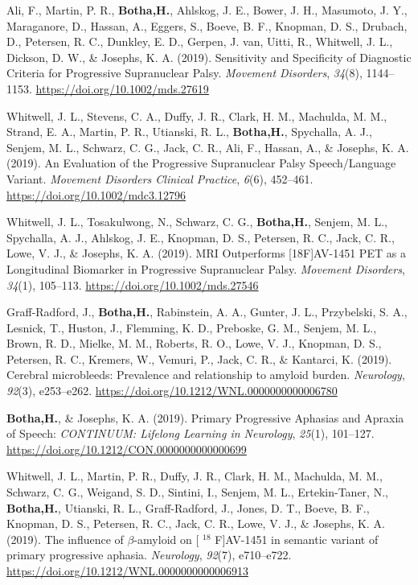 \documentclass[11pt, a4paper]{awesome-cv}
\begin{document}
\leavevmode\hypertarget{ref-ali_sensitivity_2019}{}%
Ali, F., Martin, P. R., \textbf{Botha,H.}, Ahlskog, J. E., Bower, J. H.,
Masumoto, J. Y., Maraganore, D., Hassan, A., Eggers, S., Boeve, B. F.,
Knopman, D. S., Drubach, D., Petersen, R. C., Dunkley, E. D., Gerpen, J.
van, Uitti, R., Whitwell, J. L., Dickson, D. W., \& Josephs, K. A.
(2019). Sensitivity and {Specificity} of {Diagnostic} {Criteria} for
{Progressive} {Supranuclear} {Palsy}. \emph{Movement Disorders},
\emph{34}(8), 1144--1153. \url{https://doi.org/10.1002/mds.27619}

\leavevmode\hypertarget{ref-whitwell_evaluation_2019}{}%
Whitwell, J. L., Stevens, C. A., Duffy, J. R., Clark, H. M., Machulda,
M. M., Strand, E. A., Martin, P. R., Utianski, R. L., \textbf{Botha,H.},
Spychalla, A. J., Senjem, M. L., Schwarz, C. G., Jack, C. R., Ali, F.,
Hassan, A., \& Josephs, K. A. (2019). An {Evaluation} of the
{Progressive} {Supranuclear} {Palsy} {Speech}/{Language} {Variant}.
\emph{Movement Disorders Clinical Practice}, \emph{6}(6), 452--461.
\url{https://doi.org/10.1002/mdc3.12796}

\leavevmode\hypertarget{ref-whitwell_mri_2019}{}%
Whitwell, J. L., Tosakulwong, N., Schwarz, C. G., \textbf{Botha,H.},
Senjem, M. L., Spychalla, A. J., Ahlskog, J. E., Knopman, D. S.,
Petersen, R. C., Jack, C. R., Lowe, V. J., \& Josephs, K. A. (2019).
{MRI} {Outperforms} {[}{18F}{]}{AV}-1451 {PET} as a {Longitudinal}
{Biomarker} in {Progressive} {Supranuclear} {Palsy}. \emph{Movement
Disorders}, \emph{34}(1), 105--113.
\url{https://doi.org/10.1002/mds.27546}

\leavevmode\hypertarget{ref-graff-radford_cerebral_2019}{}%
Graff-Radford, J., \textbf{Botha,H.}, Rabinstein, A. A., Gunter, J. L.,
Przybelski, S. A., Lesnick, T., Huston, J., Flemming, K. D., Preboske,
G. M., Senjem, M. L., Brown, R. D., Mielke, M. M., Roberts, R. O., Lowe,
V. J., Knopman, D. S., Petersen, R. C., Kremers, W., Vemuri, P., Jack,
C. R., \& Kantarci, K. (2019). Cerebral microbleeds: {Prevalence} and
relationship to amyloid burden. \emph{Neurology}, \emph{92}(3),
e253--e262. \url{https://doi.org/10.1212/WNL.0000000000006780}

\leavevmode\hypertarget{ref-botha_primary_2019}{}%
\textbf{Botha,H.}, \& Josephs, K. A. (2019). Primary {Progressive}
{Aphasias} and {Apraxia} of {Speech}: \emph{CONTINUUM: Lifelong Learning
in Neurology}, \emph{25}(1), 101--127.
\url{https://doi.org/10.1212/CON.0000000000000699}

\leavevmode\hypertarget{ref-whitwell_influence_2019}{}%
Whitwell, J. L., Martin, P. R., Duffy, J. R., Clark, H. M., Machulda, M.
M., Schwarz, C. G., Weigand, S. D., Sintini, I., Senjem, M. L.,
Ertekin-Taner, N., \textbf{Botha,H.}, Utianski, R. L., Graff-Radford,
J., Jones, D. T., Boeve, B. F., Knopman, D. S., Petersen, R. C., Jack,
C. R., Lowe, V. J., \& Josephs, K. A. (2019). The influence of
\(\beta\)-amyloid on {[} \(^{\textrm{18}}\) {F}{]}{AV}-1451 in semantic
variant of primary progressive aphasia. \emph{Neurology}, \emph{92}(7),
e710--e722. \url{https://doi.org/10.1212/WNL.0000000000006913}
\end{document}
